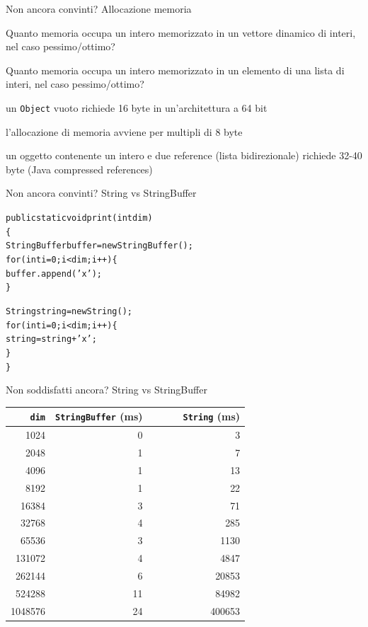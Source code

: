 \begin{frame}{Non ancora convinti? Allocazione memoria}

\begin{myboxtitle}[Domande]
\BI
\item Quanto memoria occupa un intero memorizzato in un vettore dinamico di interi, nel caso pessimo/ottimo?
\item Quanto memoria occupa un intero memorizzato in un elemento di una lista di interi, nel caso pessimo/ottimo? 
\EI
\end{myboxtitle}

\pause
{}
\BI
\item un \texttt{Object} vuoto richiede 16 byte in un'architettura a 64 bit
\item l'allocazione di memoria avviene per multipli di 8 byte
\item un oggetto contenente un intero e due reference (lista bidirezionale) richiede 32-40 byte
(Java compressed references)
\EI

\end{frame}

\begin{frame}{Non ancora convinti? String vs StringBuffer}

\begin{alltt}
public static void print(int dim)
\{
  StringBuffer buffer = new \alert{StringBuffer}();
  for (int i=0; i < dim; i++) \{
    \alert{buffer.append('x')};	
  \}

  String string = new \alert{String}();
  for (int i=0; i < dim; i++) \{
    \alert{string = string + 'x'};	
  \} 
\}
\end{alltt}

\end{frame}

\begin{frame}{Non soddisfatti ancora? String vs StringBuffer}

\begin{center}
\begin{tabular}{|r|r|r|}
\hline
\texttt{dim} & \texttt{StringBuffer} (ms) & \texttt{\ \ \ \ \ \ String} (ms)\\
\hline
1024 & 0 & 3 \\
2048 & 1 & 7 \\  
4096 & 1 & 13 \\
8192 & 1 & 22 \\
16384 & 3 & 71 \\
32768 & 4 & 285 \\
65536 & 3 & 1130 \\
131072 & 4 & 4847 \\
262144 & 6 & 20853 \\
524288 & 11 & 84982 \\
1048576 & 24 & 400653 \\
\hline
\end{tabular}
\end{center}



\end{frame}



